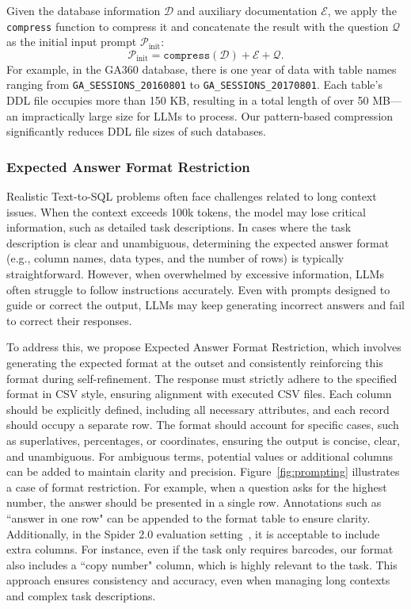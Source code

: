     Given the database information $\mathcal{D}$ and auxiliary documentation $\mathcal{E}$, we apply the \texttt{compress} function to compress it and concatenate the result with the question $\mathcal{Q}$ as the initial input prompt $\mathcal{P}_{\text{init}}$: 
    \begin{equation}
        \mathcal{P}_{\text{init}} = \texttt{compress}(\mathcal{D}) + \mathcal{E} + \mathcal{Q}.
    \end{equation}
    For example, in the GA360 database, there is one year of data with table names ranging from \texttt{GA\_SESSIONS\_20160801} to \texttt{GA\_SESSIONS\_20170801}. Each table’s DDL file occupies more than 150 KB, resulting in a total length of over 50 MB—an impractically large size for LLMs to process. 
    Our pattern-based compression significantly reduces DDL file sizes of such databases.
    
    \subsubsection{Expected Answer Format Restriction}
    Realistic Text-to-SQL problems often face challenges related to long context issues. When the context exceeds 100k tokens, the model may lose critical information, such as detailed task descriptions. In cases where the task description is clear and unambiguous, determining the expected answer format (e.g., column names, data types, and the number of rows) is typically straightforward. However, when overwhelmed by excessive information, LLMs often struggle to follow instructions accurately. Even with prompts designed to guide or correct the output, LLMs may keep generating incorrect answers and fail to correct their responses.
    
    To address this, we propose Expected Answer Format Restriction, which involves generating the expected format at the outset and consistently reinforcing this format during self-refinement. The response must strictly adhere to the specified format in CSV style, ensuring alignment with executed CSV files. Each column should be explicitly defined, including all necessary attributes, and each record should occupy a separate row. The format should account for specific cases, such as superlatives, percentages, or coordinates, ensuring the output is concise, clear, and unambiguous. For ambiguous terms, potential values or additional columns can be added to maintain clarity and precision. Figure~\ref{fig:prompting} illustrates a case of format restriction. For example, when a question asks for the highest number, the answer should be presented in a single row. Annotations such as ``answer in one row" can be appended to the format table to ensure clarity. Additionally, in the Spider 2.0 evaluation setting~\citep{lei2024spider}, it is acceptable to include extra columns. For instance, even if the task only requires barcodes, our format also includes a ``copy number" column, which is highly relevant to the task. This approach ensures consistency and accuracy, even when managing long contexts and complex task descriptions.  
    

